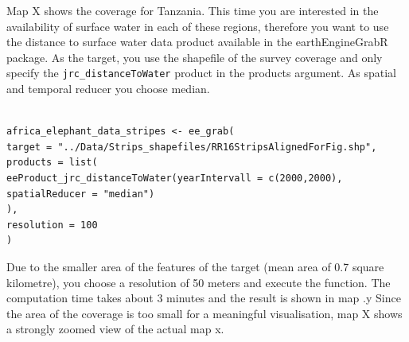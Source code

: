 Map X shows the coverage for Tanzania. This time you are interested in the availability of surface water in each of these regions, therefore you want to use the distance to surface water data product available in the earthEngineGrabR package. As the target, you use the shapefile of the survey coverage and only specify the \texttt{jrc\_distanceToWater} product in the products argument. As spatial and temporal reducer you choose median. 

\begin{lstlisting}

africa_elephant_data_stripes <- ee_grab(
target = "../Data/Strips_shapefiles/RR16StripsAlignedForFig.shp", 
products = list(
eeProduct_jrc_distanceToWater(yearIntervall = c(2000,2000), spatialReducer = "median")
),
resolution = 100
)
\end{lstlisting}




Due to the smaller area of the features of the target (mean area of 0.7 square kilometre), you choose a resolution of 50 meters and execute the function. The computation time takes about 3 minutes and the result is shown in map .y Since the area of the coverage is too small for a meaningful visualisation, map X shows a strongly zoomed view of the actual map x. 

